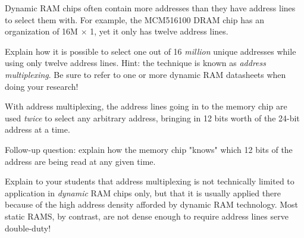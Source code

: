 

Dynamic RAM chips often contain more addresses than they have address lines to select them with.  For example, the MCM516100 DRAM chip has an organization of 16M $\times$ 1, yet it only has twelve address lines.

Explain how it is possible to select one out of 16 {\it million} unique addresses while using only twelve address lines.  Hint: the technique is known as {\it address multiplexing}.  Be sure to refer to one or more dynamic RAM datasheets when doing your research!







With address multiplexing, the address lines going in to the memory chip are used {\it twice} to select any arbitrary address, bringing in 12 bits worth of the 24-bit address at a time.

\vskip 10pt

Follow-up question: explain how the memory chip "knows" which 12 bits of the address are being read at any given time.







Explain to your students that address multiplexing is not technically limited to application in {\it dynamic} RAM chips only, but that it is usually applied there because of the high address density afforded by dynamic RAM technology.  Most static RAMS, by contrast, are not dense enough to require address lines serve double-duty!




